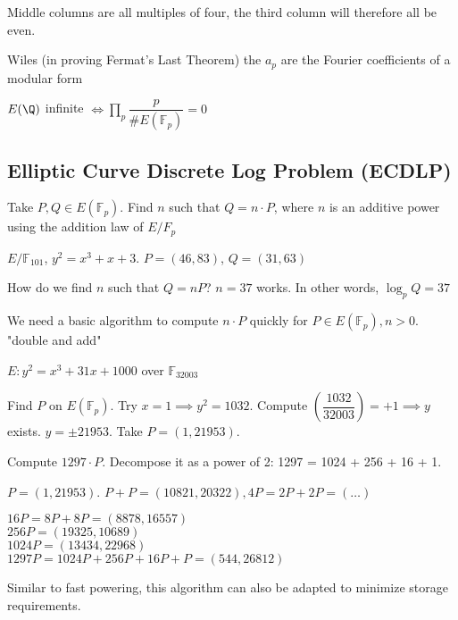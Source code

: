 \documentclass[twoside, 10pt]{article}
\newcommand{\F}{\mathbb{F}}
\begin{document}
Middle columns are all multiples of four, the third column will therefore all be even.

\begin{rmk}
    Wiles (in proving Fermat's Last Theorem) the $a_p$ are the Fourier coefficients of a modular form %
\end{rmk}
\begin{rmk}
    $E(\Q)$ infinite $\iff \prod\limits_p \dfrac{p}{\#E(\F_p)} = 0$
\end{rmk}

\subsection{Elliptic Curve Discrete Log Problem (ECDLP)}
\begin{defn}
    Take $P, Q \in E(\F_p)$. Find $n$ such that $Q = n\cdot P$, where $n$ is an additive power using the addition law of $E/F_p$
\end{defn}

\begin{exm*}
    $E/\F_{101}$, $y^2 = x^3 + x + 3$. $P = (46, 83)$, $Q = (31, 63)$
\end{exm*}
How do we find $n$ such that $Q = nP$? $n = 37$ works. In other words, $\log_p Q = 37$

We need a basic algorithm to compute $n \cdot P$ quickly for $P \in E(\F_p), n > 0$. "double and add"

\begin{exm*}
    $E: y^2 = x^3 + 31x + 1000$ over $\F_{32003}$ %
\end{exm*}

Find $P$ on $E(\F_p)$. Try $x = 1 \implies y^2 = 1032$. Compute $\left(\dfrac{1032}{32003}\right) = +1 \implies y$ exists. $y = \pm 21953$. Take $P = (1, 21953)$.

Compute $1297 \cdot P$. Decompose it as a power of 2: 1297 = 1024 + 256 + 16 + 1.

$P = (1, 21953)$. $P + P = (10821, 20322), 4P = 2P + 2P = (\ldots)$

$16P = 8P + 8P = (8878, 16557)$\\
$256P = (19325, 10689)$\\
$1024P = (13434, 22968)$\\
$1297P = 1024P + 256P + 16P + P = (544, 26812)$

\begin{rmk}
    Similar to fast powering, this algorithm can also be adapted to minimize storage requirements.
\end{rmk}
\end{document}
